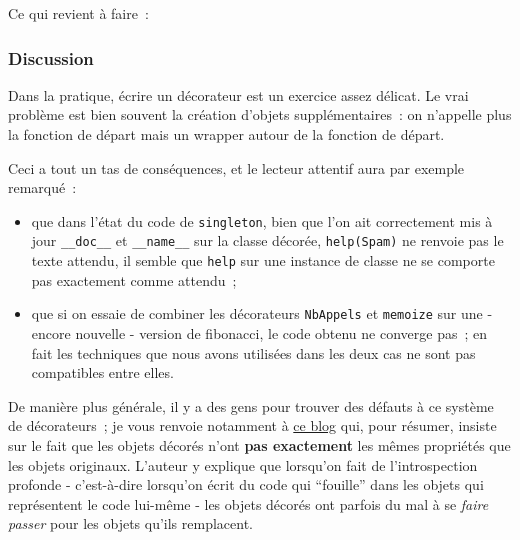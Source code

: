     Ce qui revient à faire~:

\begin{Shaded}
\begin{Highlighting}[]
\OperatorTok{=}
\OperatorTok{=}
\end{Highlighting}
\end{Shaded}

    \hypertarget{discussion}{%
\subsubsection{Discussion}\label{discussion}}

    Dans la pratique, écrire un décorateur est un exercice assez délicat. Le
vrai problème est bien souvent la création d'objets supplémentaires~: on
n'appelle plus la fonction de départ mais un wrapper autour de la
fonction de départ.

Ceci a tout un tas de conséquences, et le lecteur attentif aura par
exemple remarqué~:

\begin{itemize}
\tightlist
\item
  que dans l'état du code de \texttt{singleton}, bien que l'on ait
  correctement mis à jour \texttt{\_\_doc\_\_} et \texttt{\_\_name\_\_}
  sur la classe décorée, \texttt{help(Spam)} ne renvoie pas le texte
  attendu, il semble que \texttt{help} sur une instance de classe ne se
  comporte pas exactement comme attendu~;
\item
  que si on essaie de combiner les décorateurs \texttt{NbAppels} et
  \texttt{memoize} sur une - encore nouvelle - version de fibonacci, le
  code obtenu ne converge pas~; en fait les techniques que nous avons
  utilisées dans les deux cas ne sont pas compatibles entre elles.
\end{itemize}

De manière plus générale, il y a des gens pour trouver des défauts à ce
système de décorateurs~; je vous renvoie notamment à
\href{http://blog.dscpl.com.au/2014/01/how-you-implemented-your-python.html}{ce
blog} qui, pour résumer, insiste sur le fait que les objets décorés
n'ont \textbf{pas exactement} les mêmes propriétés que les objets
originaux. L'auteur y explique que lorsqu'on fait de l'introspection
profonde - c'est-à-dire lorsqu'on écrit du code qui ``fouille'' dans les
objets qui représentent le code lui-même - les objets décorés ont
parfois du mal à se \emph{faire passer} pour les objets qu'ils
remplacent.

